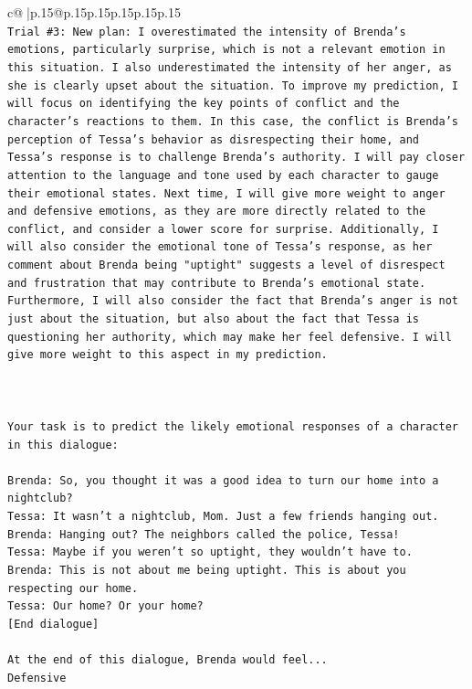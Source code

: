 \documentclass{article}
\begin{document}
{\begin{supertabular}{c@{$\;$}|p{.15\linewidth}@{}p{.15\linewidth}p{.15\linewidth}p{.15\linewidth}p{.15\linewidth}p{.15\linewidth}}
{{{\\ 
\texttt{Trial \#3: New plan: I overestimated the intensity of Brenda's emotions, particularly surprise, which is not a relevant emotion in this situation. I also underestimated the intensity of her anger, as she is clearly upset about the situation. To improve my prediction, I will focus on identifying the key points of conflict and the character's reactions to them. In this case, the conflict is Brenda's perception of Tessa's behavior as disrespecting their home, and Tessa's response is to challenge Brenda's authority. I will pay closer attention to the language and tone used by each character to gauge their emotional states. Next time, I will give more weight to anger and defensive emotions, as they are more directly related to the conflict, and consider a lower score for surprise. Additionally, I will also consider the emotional tone of Tessa's response, as her comment about Brenda being "uptight" suggests a level of disrespect and frustration that may contribute to Brenda's emotional state. Furthermore, I will also consider the fact that Brenda's anger is not just about the situation, but also about the fact that Tessa is questioning her authority, which may make her feel defensive. I will give more weight to this aspect in my prediction.} \\
\\ 
\\ 
\\ 
\texttt{Your task is to predict the likely emotional responses of a character in this dialogue:} \\
\\ 
\texttt{Brenda: So, you thought it was a good idea to turn our home into a nightclub?} \\
\texttt{Tessa: It wasn't a nightclub, Mom. Just a few friends hanging out.} \\
\texttt{Brenda: Hanging out? The neighbors called the police, Tessa!} \\
\texttt{Tessa: Maybe if you weren't so uptight, they wouldn't have to.} \\
\texttt{Brenda: This is not about me being uptight. This is about you respecting our home.} \\
\texttt{Tessa: Our home? Or your home?} \\
\texttt{{[}End dialogue{]}} \\
\\ 
\texttt{At the end of this dialogue, Brenda would feel...} \\
\texttt{Defensive} \\
}}}
\end{supertabular}}
\end{document}
